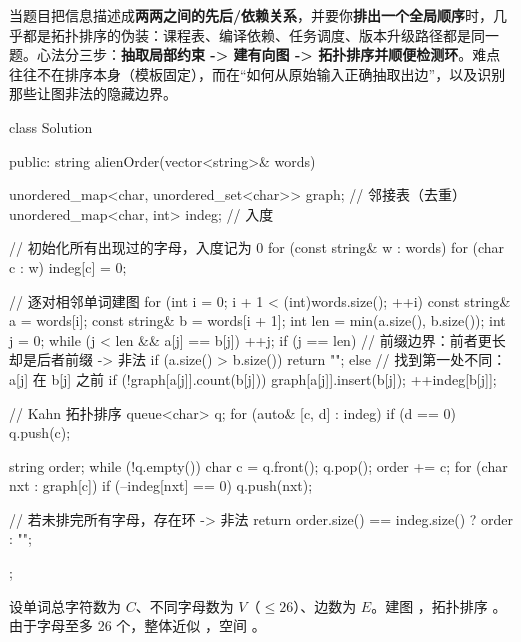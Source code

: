 \begin{idea}[“求一个满足所有约束的顺序” = 拓扑排序]
当题目把信息描述成\textbf{两两之间的先后/依赖关系}，并要你\textbf{排出一个全局顺序}时，几乎都是拓扑排序的伪装：课程表、编译依赖、任务调度、版本升级路径都是同一题。心法分三步：\textbf{抽取局部约束 -> 建有向图 -> 拓扑排序并顺便检测环}。难点往往不在排序本身（模板固定），而在“如何从原始输入正确抽取出边”，以及识别那些让图非法的隐藏边界。
\end{idea}

\begin{cpp}
class Solution {
public:
    string alienOrder(vector<string>& words) {
        unordered_map<char, unordered_set<char>> graph; // 邻接表（去重）
        unordered_map<char, int> indeg;                 // 入度

        // 初始化所有出现过的字母，入度记为 0
        for (const string& w : words)
            for (char c : w) indeg[c] = 0;

        // 逐对相邻单词建图
        for (int i = 0; i + 1 < (int)words.size(); ++i) {
            const string& a = words[i];
            const string& b = words[i + 1];
            int len = min(a.size(), b.size());
            int j = 0;
            while (j < len && a[j] == b[j]) ++j;
            if (j == len) {
                // 前缀边界：前者更长却是后者前缀 -> 非法
                if (a.size() > b.size()) return "";
            } else {
                // 找到第一处不同：a[j] 在 b[j] 之前
                if (!graph[a[j]].count(b[j])) {
                    graph[a[j]].insert(b[j]);
                    ++indeg[b[j]];
                }
            }
        }

        // Kahn 拓扑排序
        queue<char> q;
        for (auto& [c, d] : indeg)
            if (d == 0) q.push(c);

        string order;
        while (!q.empty()) {
            char c = q.front(); q.pop();
            order += c;
            for (char nxt : graph[c])
                if (--indeg[nxt] == 0) q.push(nxt);
        }

        // 若未排完所有字母，存在环 -> 非法
        return order.size() == indeg.size() ? order : "";
    }
};
\end{cpp}

\begin{keypoint}[复杂度]
设单词总字符数为 $C$、不同字母数为 $V$（$\le 26$）、边数为 $E$。建图 ，拓扑排序 。由于字母至多 26 个，整体近似 ，空间 。
\end{keypoint}


